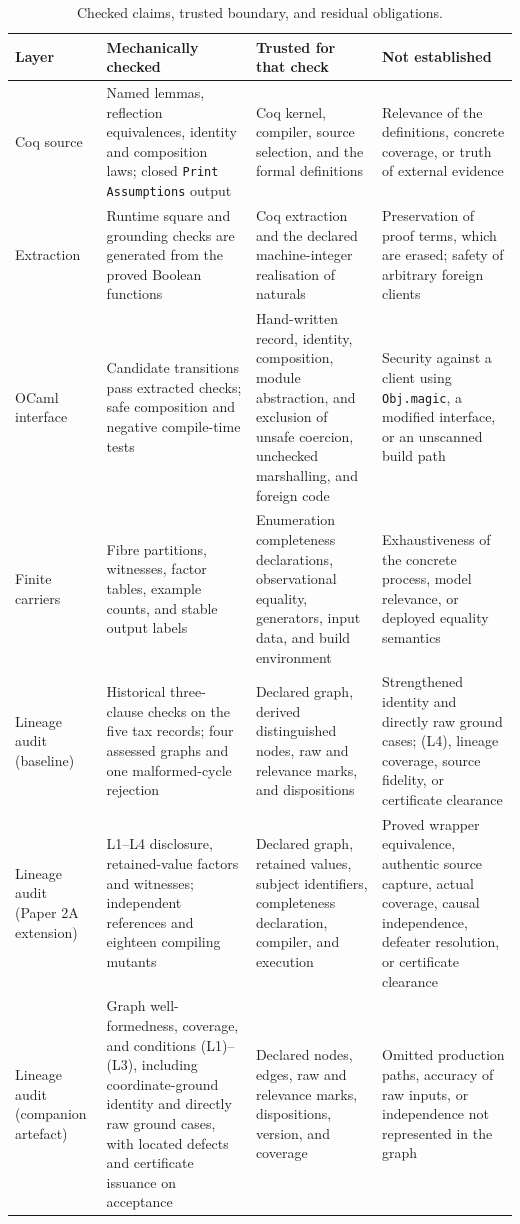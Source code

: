 \documentclass[11pt]{article}
\theoremstyle{definition}
\newcommand{\code}[1]{\texttt{#1}}
\begin{document}
\begin{table}[htbp]
\centering
\scriptsize
\caption{Checked claims, trusted boundary, and residual obligations.}
\label{ex:tab:trust-boundary}
\begin{tabularx}{\textwidth}{@{}P{2.1cm}LLL@{}}
\toprule
Layer & Mechanically checked & Trusted for that check & Not established \\
\midrule
Coq source & Named lemmas, reflection equivalences, identity and composition laws; closed \code{Print Assumptions} output & Coq kernel, compiler, source selection, and the formal definitions & Relevance of the definitions, concrete coverage, or truth of external evidence \\
Extraction & Runtime square and grounding checks are generated from the proved Boolean functions & Coq extraction and the declared machine-integer realisation of naturals & Preservation of proof terms, which are erased; safety of arbitrary foreign clients \\
OCaml interface & Candidate transitions pass extracted checks; safe composition and negative compile-time tests & Hand-written record, identity, composition, module abstraction, and exclusion of unsafe coercion, unchecked marshalling, and foreign code & Security against a client using \code{Obj.magic}, a modified interface, or an unscanned build path \\
Finite carriers & Fibre partitions, witnesses, factor tables, example counts, and stable output labels & Enumeration completeness declarations, observational equality, generators, input data, and build environment & Exhaustiveness of the concrete process, model relevance, or deployed equality semantics \\
Lineage audit (baseline) & Historical three-clause checks on the five tax records; four assessed graphs and one malformed-cycle rejection & Declared graph, derived distinguished nodes, raw and relevance marks, and dispositions & Strengthened identity and directly raw ground cases; (L4), lineage coverage, source fidelity, or certificate clearance \\
Lineage audit (Paper 2A extension) & L1--L4 disclosure, retained-value factors and witnesses; independent references and eighteen compiling mutants & Declared graph, retained values, subject identifiers, completeness declaration, compiler, and execution & Proved wrapper equivalence, authentic source capture, actual coverage, causal independence, defeater resolution, or certificate clearance \\
Lineage audit (companion artefact) & Graph well-formedness, coverage, and conditions (L1)--(L3), including coordinate-ground identity and directly raw ground cases, with located defects and certificate issuance on acceptance & Declared nodes, edges, raw and relevance marks, dispositions, version, and coverage & Omitted production paths, accuracy of raw inputs, or independence not represented in the graph \\

\end{tabularx}
\end{table}
\end{document}
